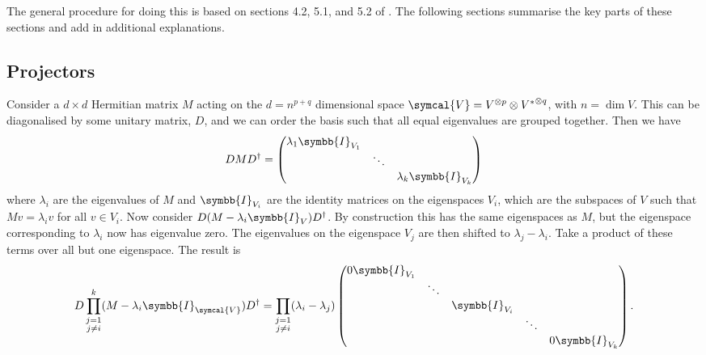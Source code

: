 \documentclass[fleqn]{NotesClass}
\newcommand{\identityMatrix}{\symbb{I}}
\newcommand{\hermit}{\dagger}
\newcommand{\dual}[1]{{#1^{*}}}
\begin{document}
    The general procedure for doing this is based on sections 4.2, 5.1, and 5.2 of \cite{cvitanovic}.
    The following sections summarise the key parts of these sections and add in additional explanations.
    
    \subsection{Projectors}
    Consider a \(d \times d\) Hermitian matrix \(M\) acting on the \(d = n^{p + q}\) dimensional space \(\symcal{V} = V^{\otimes p} \otimes \dual{V}^{\otimes q}\), with \(n = \dim V\).
    This can be diagonalised by some unitary matrix, \(D\), and we can order the basis such that all equal eigenvalues are grouped together.
    Then we have
    \begin{equation}
        DMD^{\hermit} = 
        \begin{pmatrix}
            \lambda_1\identityMatrix_{V_1} & & \\
            & \ddots & \\
            & & \lambda_k\identityMatrix_{V_k}
        \end{pmatrix}
    \end{equation}
    where \(\lambda_i\) are the eigenvalues of \(M\) and \(\identityMatrix_{V_i}\) are the identity matrices on the eigenspaces \(V_i\), which are the subspaces of \(V\) such that \(Mv = \lambda_iv\) for all \(v \in V_i\).
    Now consider \(D(M - \lambda_i\identityMatrix_V)D^{\hermit}\).
    By construction this has the same eigenspaces as \(M\), but the eigenspace corresponding to \(\lambda_i\) now has eigenvalue zero.
    The eigenvalues on the eigenspace \(V_j\) are then shifted to \(\lambda_j - \lambda_i\).
    Take a product of these terms over all but one eigenspace.
    The result is
    \begin{equation}
        D \prod_{\substack{j = 1\\ j \ne i}}^{k} (M - \lambda_i\identityMatrix_{\symcal{V}})D^\hermit = \prod_{\substack{j=1\\ j \ne i}} (\lambda_i - \lambda_j)
        \begin{pmatrix}
            0\identityMatrix_{V_1} \\
            & \ddots \\
            && \identityMatrix_{V_i} \\
            &&& \ddots \\
            &&&& 0\identityMatrix_{V_k}
        \end{pmatrix}
        .
    \end{equation}
\end{document}
